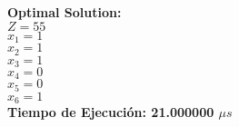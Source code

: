 \documentclass[12pt]{article}
\newcommand\tab[1][1cm]{\hspace*{#1}}
\begin{document}
\textbf{Optimal Solution:}\\
\tab $Z = 55$\\
\tab$x_{1} = 1$\\
\tab$x_{2} = 1$\\
\tab$x_{3} = 1$\\
\tab$x_{4} = 0$\\
\tab$x_{5} = 0$\\
\tab$x_{6} = 1$\\
\textbf{Tiempo de Ejecuci\'on: 21.000000 $\mu s$} \\
\end{document}

